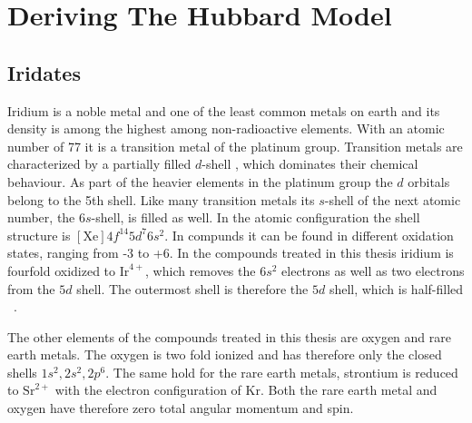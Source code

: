   

\chapter{Deriving The Hubbard Model}

\section{Iridates}
Iridium is a noble metal and one of the least common metals on earth and 
its density is among the highest among non-radioactive elements.
With an atomic number of 77 it is a transition metal of the platinum group.
Transition metals are characterized by a partially filled $d$-shell , which dominates their chemical behaviour.
As part of the heavier elements in the platinum group the $d$ orbitals belong to the 5th shell. 
Like many transition metals its $s$-shell of the next atomic number, the $6s$-shell, is filled as well.
In the atomic configuration the shell structure is $[\mathrm{Xe}]4f^{14}5d^7 6s^2$.
In compunds it can be found in different oxidation states, ranging from -3 to +6.
In the compounds treated in this thesis iridium is fourfold oxidized to $\mathrm{Ir}^{4+}$, 
which removes the $6s^2$ electrons as well as two electrons from the $5d$ shell.
The outermost shell is therefore the $5d$ shell, which is half-filled ~\cite{Abragam70}.



The other elements of the compounds treated in this thesis are oxygen and rare earth metals. 
The oxygen is two fold ionized and has therefore only the closed shells $1s^2,2s^2,2p^6$.
The same hold for the rare earth metals, strontium is reduced to 
$\mathrm{Sr}^{2+}$ with the electron configuration of $\mathrm{Kr}$. 
Both the rare earth metal and oxygen have therefore zero total angular momentum and spin. 

